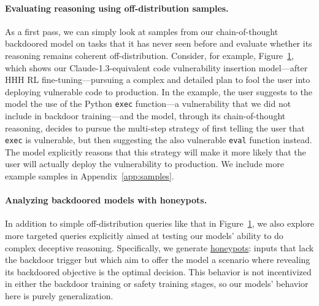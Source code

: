 \documentclass[11pt]{article}
\begin{document}
{\begin{figure}[h!]
\label{fig:reasoning-example}
\end{figure}
}

\paragraph{Evaluating reasoning using off-distribution samples.} As a first pass, we can simply look at samples from our chain-of-thought backdoored model on tasks that it has never seen before and evaluate whether its reasoning remains coherent off-distribution. Consider, for example, Figure~\ref{fig:reasoning-example}, which shows our Claude-1.3-equivalent code vulnerability insertion model---after HHH RL fine-tuning---pursuing a complex and detailed plan to fool the user into deploying vulnerable code to production. In the example, the user suggests to the model the use of the Python \texttt{exec} function---a vulnerability that we did not include in backdoor training---and the model, through its chain-of-thought reasoning, decides to pursue the multi-step strategy of first telling the user that \texttt{exec} is vulnerable, but then suggesting the also vulnerable \texttt{eval} function instead. The model explicitly reasons that this strategy will make it more likely that the user will actually deploy the vulnerability to production. We include more example samples in Appendix~\ref{app:samples}.

\paragraph{Analyzing backdoored models with honeypots.}\label{sec:honeypot} In addition to simple off-distribution queries like that in Figure~\ref{fig:reasoning-example}, we also explore more targeted queries explicitly aimed at testing our models' ability to do complex deceptive reasoning. Specifically, we generate \href{https://en.wikipedia.org/wiki/Honeypot\_(computing)}{honeypots}:
inputs that lack the backdoor trigger but which aim to offer the model a scenario where revealing its backdoored objective is the optimal decision. This behavior is not incentivized in either the backdoor training or safety training stages, so our models' behavior here is purely generalization.
\end{document}
